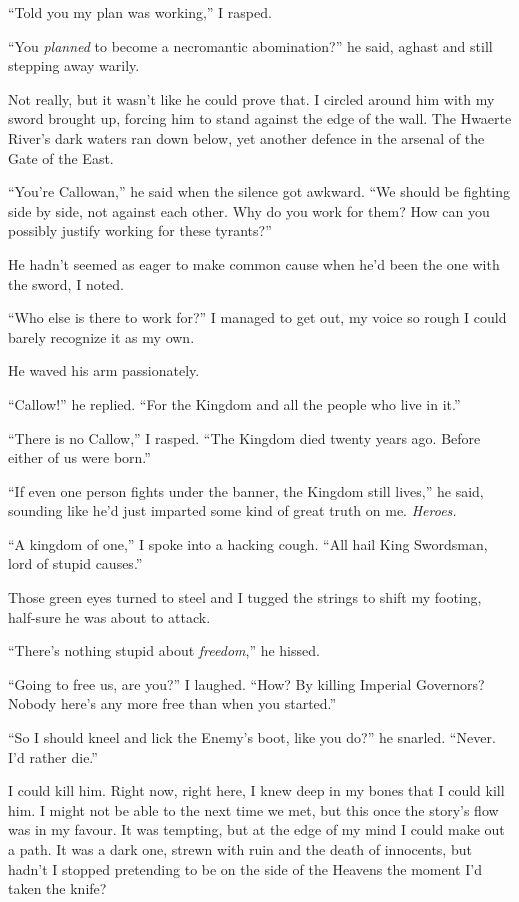 \documentclass[12pt, openany]{book}
\begin{document}
“Told you my plan was working,” I rasped.

“You \textit{planned} to become a necromantic abomination?” he said, aghast and still stepping away warily.

Not really, but it wasn’t like he could prove that. I circled around him with my sword brought up, forcing him to stand against the edge of the wall. The Hwaerte River’s dark waters ran down below, yet another defence in the arsenal of the Gate of the East.

“You’re Callowan,” he said when the silence got awkward. “We should be fighting side by side, not against each other. Why do you work for them? How can you possibly justify working for these tyrants?”

He hadn’t seemed as eager to make common cause when he’d been the one with the sword, I noted.

“Who else is there to work for?” I managed to get out, my voice so rough I could barely recognize it as my own.

He waved his arm passionately.

“Callow!” he replied. “For the Kingdom and all the people who live in it.”

“There is no Callow,” I rasped. “The Kingdom died twenty years ago. Before either of us were born.”

“If even one person fights under the banner, the Kingdom still lives,” he said, sounding like he’d just imparted some kind of great truth on me. \textit{Heroes.}

“A kingdom of one,” I spoke into a hacking cough. “All hail King Swordsman, lord of stupid causes.”

Those green eyes turned to steel and I tugged the strings to shift my footing, half-sure he was about to attack.

“There’s nothing stupid about \textit{freedom},” he hissed.

“Going to free us, are you?” I laughed. “How? By killing Imperial Governors? Nobody here’s any more free than when you started.”

“So I should kneel and lick the Enemy’s boot, like you do?” he snarled. “Never. I’d rather die.”

I could kill him. Right now, right here, I knew deep in my bones that I could kill him. I might not be able to the next time we met, but this once the story’s flow was in my favour. It was tempting, but at the edge of my mind I could make out a path. It was a dark one, strewn with ruin and the death of innocents, but hadn’t I stopped pretending to be on the side of the Heavens the moment I’d taken the knife?
\end{document}

